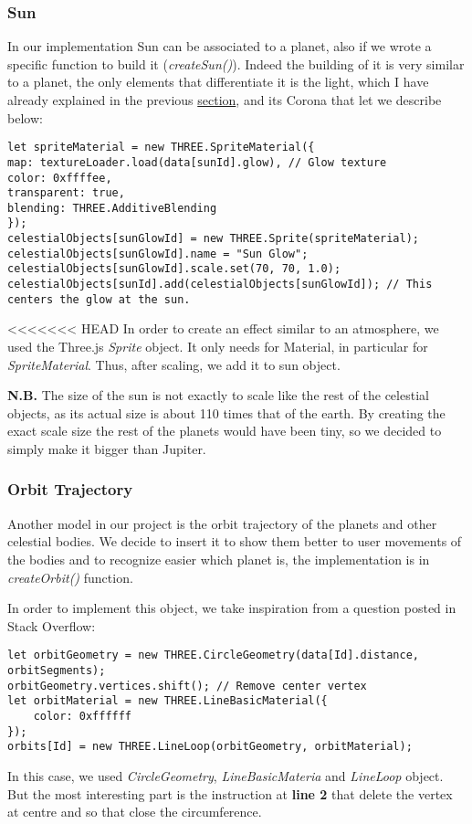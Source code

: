 \documentclass{article}
\begin{document}
\subsubsection{Sun}
In our implementation Sun can be associated to a planet, also if we wrote a specific function to build it (\textit{createSun()}). Indeed the building of it is very similar to a planet, the only elements that differentiate it is the light, which I have already explained in the previous \hyperref[subsec:pointlight]{section}, and its Corona that let we describe below:
\begin{lstlisting}
let spriteMaterial = new THREE.SpriteMaterial({
map: textureLoader.load(data[sunId].glow), // Glow texture
color: 0xffffee,
transparent: true,
blending: THREE.AdditiveBlending
});
celestialObjects[sunGlowId] = new THREE.Sprite(spriteMaterial);
celestialObjects[sunGlowId].name = "Sun Glow";
celestialObjects[sunGlowId].scale.set(70, 70, 1.0);
celestialObjects[sunId].add(celestialObjects[sunGlowId]); // This centers the glow at the sun.
\end{lstlisting}
<<<<<<< HEAD
In order to create an effect similar to an atmosphere, we used the Three.js \textit{Sprite}\cite{documentation:threejs} object. It only needs for Material, in particular for \textit{SpriteMaterial}\cite{documentation:threejs}. Thus, after scaling, we add it to sun object.
\par \textbf{N.B.} The size of the sun is not exactly to scale like the rest of the celestial objects, as its actual size is about 110 times that of the earth. By creating the exact scale size the rest of the planets would have been tiny, so we decided to simply make it bigger than Jupiter.

\subsubsection{Orbit Trajectory}
Another model in our project is the orbit trajectory of the planets and other celestial bodies. We decide to insert it to show them better to user movements of the bodies and to recognize easier which planet is, the implementation is in \textit{createOrbit()} function. 
\par In order to implement this object, we take inspiration from a question posted in Stack Overflow\cite{trajectory:stackoverflow}:
\begin{lstlisting}
let orbitGeometry = new THREE.CircleGeometry(data[Id].distance, orbitSegments);
orbitGeometry.vertices.shift(); // Remove center vertex
let orbitMaterial = new THREE.LineBasicMaterial({
	color: 0xffffff
});
orbits[Id] = new THREE.LineLoop(orbitGeometry, orbitMaterial);
\end{lstlisting}
In this case, we used \textit{CircleGeometry}\cite{documentation:threejs}, \textit{LineBasicMateria}\cite{documentation:threejs} and \textit{LineLoop}\cite{documentation:threejs} object. But the most interesting part is the instruction at \textbf{line 2} that delete the vertex at centre and so that close the circumference.
\end{document}
